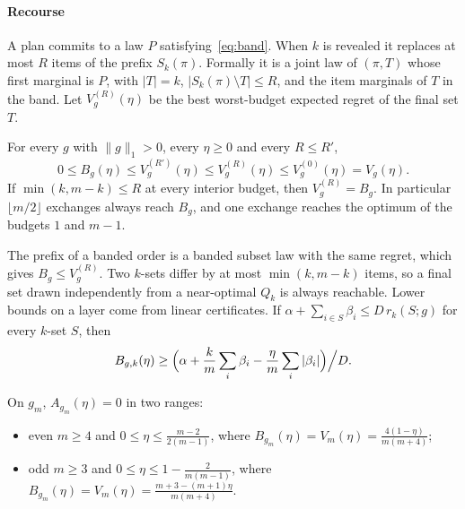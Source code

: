 \paragraph{Recourse} A plan commits to a law $P$ satisfying~\eqref{eq:band}. When $k$ is
revealed it replaces at most $R$ items of the prefix $S_{k}(\pi)$. Formally it is a joint law
of $(\pi,T)$ whose first marginal is $P$, with $|T|=k$, $|S_{k}(\pi)\setminus T|\le R$, and the
item marginals of $T$ in the band. Let $V^{(R)}_{g}(\eta)$ be the best worst-budget expected
regret of the final set $T$.

\begin{proposition}
\label{prop:sandwich}
For every $g$ with $\|g\|_1>0$, every $\eta\ge0$ and every $R\le R'$,
\[
0\le B_{g}(\eta)\le V^{(R')}_{g}(\eta)\le V^{(R)}_{g}(\eta)\le V^{(0)}_{g}(\eta)=V_{g}(\eta).
\]
If $\min(k,m-k)\le R$ at every interior budget, then $V^{(R)}_{g}=B_{g}$. In particular
$\lfloor m/2\rfloor$ exchanges always reach $B_{g}$, and one exchange reaches the optimum of the
budgets $1$ and $m-1$.
\end{proposition}

The prefix of a banded order is a banded subset law with the same regret, which gives
$B_g\le V^{(R)}_g$. Two $k$-sets differ by at most $\min(k,m-k)$ items, so a final set drawn
independently from a near-optimal $Q_{k}$ is always reachable. Lower bounds on a layer come
from linear certificates. If $\alpha+\sum_{i\in S}\beta_{i}\le D\,r_{k}(S;g)$ for every $k$-set
$S$, then
\[
B_{g,k}(\eta)\ge\Bigl(\alpha+\frac km\sum_{i}\beta_{i}-\frac\eta m\sum_{i}|\beta_{i}|\Bigr)\Big/D.
\]

\begin{theorem}
\label{thm:zerovalue}
On $g_{m}$, $A_{g_m}(\eta)=0$ in two ranges:
\begin{itemize}
\item even $m\ge4$ and $0\le\eta\le\frac{m-2}{2(m-1)}$, where
$B_{g_m}(\eta)=V_{m}(\eta)=\frac{4(1-\eta)}{m(m+4)}$;
\item odd $m\ge3$ and $0\le\eta\le1-\frac{2}{m(m-1)}$, where
$B_{g_m}(\eta)=V_{m}(\eta)=\frac{m+3-(m+1)\eta}{m(m+4)}$.
\end{itemize}
\end{theorem}

